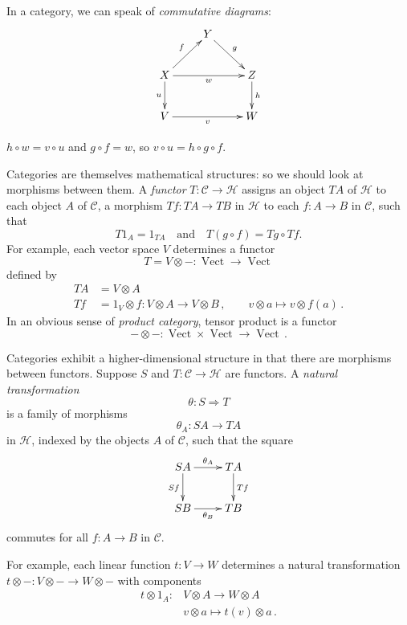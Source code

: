 \documentclass[a4paper,12pt]{article}
\theoremstyle{definition}
\theoremstyle{fact}
\theoremstyle{genquest}
\theoremstyle{step}
\newcommand{\catC}{\mathcal{C}}
\newcommand{\catH}{\mathcal{H}}
\newcommand{\Vect}{\operatorname{Vect}}
\newcommand{\longto}{\longrightarrow}
\begin{document}
In a category, we can speak of \emph{commutative diagrams}:
\begin{equation*}
\xymatrix{
& Y \ar[rd]^-{ g}  & \\
X \ar[ru]^-{f} \ar[d]_-{u} \ar[rr]_-{w} & & Z \ar[d]^-{h} \\
V \ar[rr]_-{v} & & W }
\end{equation*}
%
\begin{center}
$h \circ w = v \circ u$ \quad and \quad $g \circ f = w$, \quad
so $v \circ u = h \circ g \circ f$.
\end{center}

Categories are themselves mathematical structures: so we should look at morphisms between them.
A \emph{functor} $T : \catC  \longto \catH$ assigns an object $TA$ of $\catH$ to each object $A$ of $\catC$, 
a morphism $Tf : TA  \longto TB$ in $\catH$ to each $f : A  \longto B$ in $\catC$, such that
\[
T1_A = 1_{TA} \quad \mbox{and} \quad T(g \circ f) = Tg \circ Tf.
\]
For example, each vector space $V$ determines a functor
\[
T = V\otimes - : \Vect  \longto \Vect 
\]
defined by
\begin{align*}
TA &= V \otimes A  \\
Tf &= 1_V \otimes f : V \otimes A \longto V \otimes B\,,   \qquad  v \otimes a \longmapsto v \otimes f(a)\,. 
\end{align*}
In an obvious sense of \emph{product category}, tensor product is a functor
\[
- \otimes - : \Vect  \times \Vect  \longto \Vect\,.
\]


Categories exhibit a higher-dimensional structure in that there are morphisms between functors.
Suppose $S$ and $T : \catC \longto \catH$ are functors. A \emph{natural transformation}
\[
\theta : S \Longrightarrow T
\]
is a family of morphisms
\[
\theta_A : SA \longto TA
\]
in $\catH$, indexed by the objects $A$ of $\catC$, such that the square
\[
\xymatrix{
   S A \ar[r]^{\theta_A} \ar[d]_{Sf}   & TA  \ar[d]^{Tf}\\
    SB \ar[r]_{\theta_B}    & TB}
\]
commutes for all $f : A \longto B$ in $\catC$.

\medskip

For example, each linear function $t : V \longto W$ determines a natural transformation 
$t \otimes - : V \otimes - \longto W \otimes -$ with components
\begin{align*}
  t \otimes 1_A : &V \otimes A \longto W \otimes A \\
 & v \otimes a \longmapsto t(v) \otimes a\,. 
\end{align*}
\end{document}
